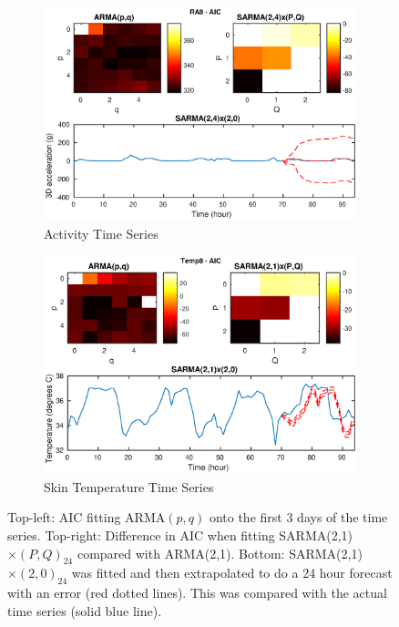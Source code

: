 \documentclass[a4paper]{proc}
\begin{document}
\begin{figure}[p]
    \begin{subfigure}[b]{\textwidth}
        \includegraphics[width=\textwidth]{aic_ra_8.eps}
        \caption{Activity Time Series}
    \end{subfigure}
    \begin{subfigure}[b]{\textwidth}
        \includegraphics[width=\textwidth]{aic_temp_8.eps}
        \caption{Skin Temperature Time Series}
    \end{subfigure}
    \caption{Top-left: AIC fitting ARMA$(p,q)$ onto the first 3 days of the time series. Top-right: Difference in AIC when fitting SARMA(2,1)$\times(P,Q)_{24}$ compared with ARMA(2,1). Bottom: SARMA(2,1)$\times(2,0)_{24}$ was fitted and then extrapolated to do a 24 hour forecast with an error (red dotted lines). This was compared with the actual time series (solid blue line).}
    \label{fig:sarmafit}
\end{figure}
\end{document}
